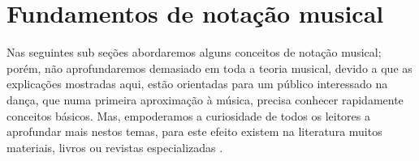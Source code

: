 
\chapter{Fundamentos de notação musical}
\label{cap:musicabasica}
Nas seguintes sub seções abordaremos alguns conceitos de notação musical;
porém, não aprofundaremos demasiado em toda a teoria musical, 
devido a que as explicações mostradas aqui, estão
orientadas para um público interessado na dança, que numa primeira 
aproximação à música, precisa conhecer rapidamente conceitos básicos. 
Mas, empoderamos a curiosidade de todos os leitores a aprofundar mais nestos temas, 
para este efeito existem na literatura muitos materiais, livros ou revistas especializadas 
\cite{medteoria}        %
\cite{cardoso1973curso} %
\cite{mascarenhascurso} %
\cite{grabner2001teoria}%
\cite{alves2004teoria}  %
\cite{apel1969harvard}  %
\cite{azevedocompor}    %
\cite{adolfo2002musica}.%

 
     
     

         











